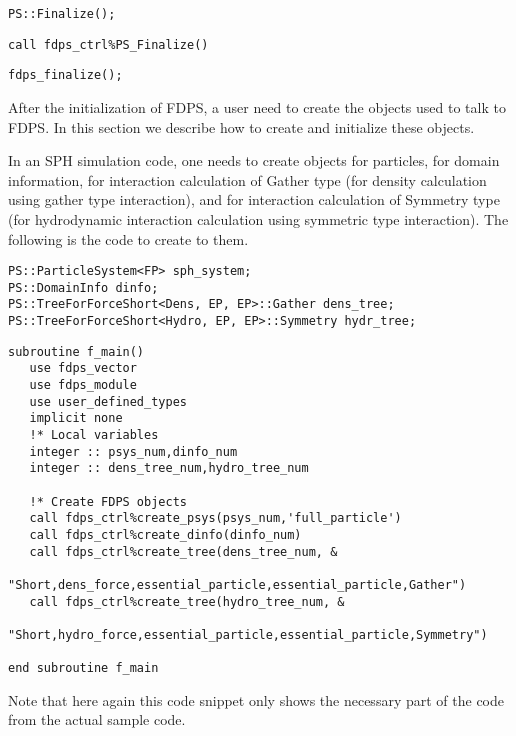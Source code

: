 \ifCpp %
\begin{lstlisting}[caption=Termination of FDPS]
PS::Finalize();
\end{lstlisting}
\endifCpp
\ifFtn %
\begin{lstlisting}[caption=Termination of FDPS]
call fdps_ctrl%PS_Finalize()
\end{lstlisting}
\endifFtn
\ifC %
\begin{lstlisting}[caption=Termination of FDPS]
fdps_finalize();
\end{lstlisting}
\endifC


After the initialization of FDPS, a user need to create the objects used to talk to FDPS. In this section we describe how to create and initialize these objects.

In an SPH simulation code, one needs to create objects for particles, for domain information, for interaction calculation of Gather type (for density calculation using gather type interaction), and for interaction calculation of Symmetry type  (for hydrodynamic interaction calculation using symmetric type interaction). The following is the code to create to them.

\ifCpp %
\begin{lstlisting}[caption=Creation of FDPS Objects]
PS::ParticleSystem<FP> sph_system;
PS::DomainInfo dinfo;
PS::TreeForForceShort<Dens, EP, EP>::Gather dens_tree;
PS::TreeForForceShort<Hydro, EP, EP>::Symmetry hydr_tree;
\end{lstlisting}
\endifCpp
\ifFtn %
\begin{lstlisting}[caption=Creation of necessary FDPS objects]
subroutine f_main()
   use fdps_vector
   use fdps_module
   use user_defined_types
   implicit none
   !* Local variables
   integer :: psys_num,dinfo_num
   integer :: dens_tree_num,hydro_tree_num
   
   !* Create FDPS objects
   call fdps_ctrl%create_psys(psys_num,'full_particle')
   call fdps_ctrl%create_dinfo(dinfo_num)
   call fdps_ctrl%create_tree(dens_tree_num, &
                              "Short,dens_force,essential_particle,essential_particle,Gather")
   call fdps_ctrl%create_tree(hydro_tree_num, &
                              "Short,hydro_force,essential_particle,essential_particle,Symmetry")

end subroutine f_main
\end{lstlisting}
Note that here again this code snippet only shows the necessary part of the code from the actual sample code.

